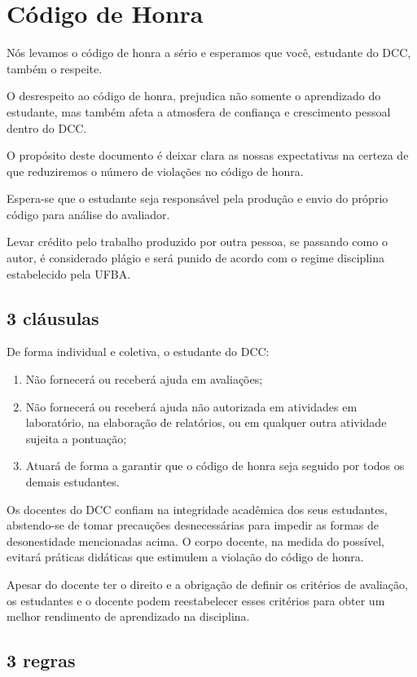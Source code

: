 \chapter{Código de Honra}

Nós levamos o código de honra a sério e esperamos que você, estudante do DCC, também o respeite.

O desrespeito ao código de honra, prejudica não somente o aprendizado do estudante, mas também afeta a atmosfera de confiança e crescimento pessoal dentro do DCC.

O propósito deste documento é deixar clara as nossas expectativas na certeza de que reduziremos o número de violações no código de honra.

Espera-se que o estudante seja responsável pela produção e envio do próprio código para análise do avaliador.

 Levar crédito pelo trabalho produzido por outra pessoa, se passando como o autor, é considerado plágio e será punido de acordo com o regime disciplina estabelecido pela UFBA.
 
 \section{3 cláusulas}

De forma individual e coletiva, o estudante do DCC:
  \begin{enumerate}
  \item Não fornecerá ou receberá ajuda em avaliações;
  \item Não fornecerá ou receberá ajuda não autorizada em atividades em laboratório, na elaboração de relatórios, ou em qualquer outra atividade sujeita a pontuação;
  \item Atuará de forma a garantir que o código de honra seja seguido por todos os demais estudantes.
  \end{enumerate}
  
  Os docentes do DCC confiam na integridade acadêmica dos seus estudantes, abstendo-se de tomar precauções desnecessárias para impedir as formas de desonestidade mencionadas acima. O corpo docente, na medida do possível, evitará práticas didáticas que estimulem a violação do código de honra.
  
  Apesar do docente ter o direito e a obrigação de definir os critérios de avaliação, os estudantes e o docente podem reestabelecer esses critérios para obter um melhor rendimento de aprendizado na disciplina.
  
  \section{3 regras}
  
